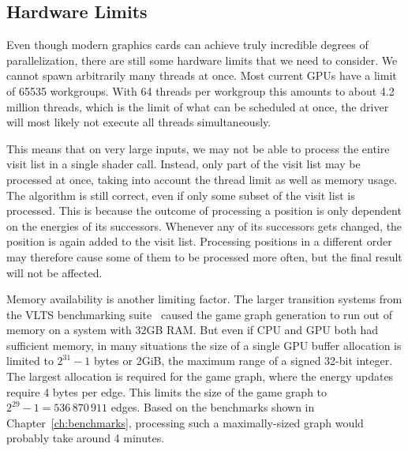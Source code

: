 \subsection{Hardware Limits}\label{subsec:hw_limits}

Even though modern graphics cards can achieve truly incredible degrees of
parallelization,
there are still some hardware limits that we need to consider.
We cannot spawn arbitrarily many threads at once.
Most current GPUs have a limit of 65535 workgroups.
With 64 threads per workgroup this amounts to about 4.2 million threads,
which is the limit of what can be scheduled at once, the driver will most
likely not execute all threads simultaneously.

This means that on very large inputs,
we may not be able to process the entire visit list in a single shader call.
Instead, only part of the visit list may be processed at once,
taking into account the thread limit as well as memory usage.
The algorithm is still correct,
even if only some subset of the visit list is processed.
This is because the outcome of processing a position is only dependent
on the energies of its successors.
Whenever any of its successors gets changed,
the position is again added to the visit list.
Processing positions in a different order may therefore cause some of them
to be processed more often,
but the final result will not be affected.

Memory availability is another limiting factor.
The larger transition systems from the VLTS benchmarking suite~\cite{vlts}
caused the game graph generation to run out of memory
on a system with 32GB RAM\@.
But even if CPU and GPU both had sufficient memory,
in many situations the size of a single GPU buffer allocation
is limited to $2^{31} - 1$ bytes or 2GiB,
the maximum range of a signed 32-bit integer.
The largest allocation is required for the game graph,
where the energy updates require 4 bytes per edge.
This limits the size of the game graph to
$2^{29} - 1 = 536\,870\,911$ edges.
Based on the benchmarks shown in Chapter~\ref{ch:benchmarks},
processing such a maximally-sized graph would probably take around 4 minutes.
